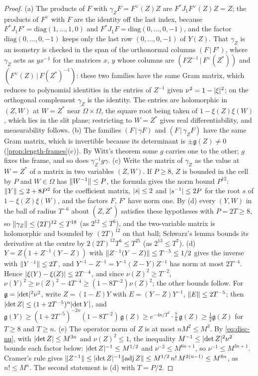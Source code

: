 \begin{proof}
(a) The products of $F$ with $\gamma_ZF=F^\vee(Z)Z$ are $F^*J_1F^\vee(Z)Z=Z$; the products of $F^\vee$ with $F$ are the identity off the last index, because $F^*J_1F'=\mathrm{diag}(1,\dots,1,0)$ and $F^*J_1F=\mathrm{diag}(0,\dots,0,-1)$, and the factor
$\mathrm{diag}(0,\dots,0,-1)$ keeps only the last row $(0,\dots,0,-1)$ of $Y(Z)$. That $\gamma_Z$ is an isometry is checked in the span of the orthonormal columns $(F\,|\,F')$, where $\gamma_Z$ acts as $yx^{-1}$ for the
matrices $x$, $y$ whose columns are $(FZ^{-1}\,|\,F^\vee(Z^*))$ and $(F^\vee(Z)\,|\,F(Z^*)^{-1})$: these two families have the same Gram matrix, which reduces to polynomial identities in the entries of $Z^{-1}$ given
$\nu^2=1-\lvert \xi\rvert^2$; on the orthogonal complement $\gamma_Z$ is the identity. The entries are holomorphic in $(Z,W)$ at $W=Z^*$ near $\Omega\times\Omega$, the square root being taken of $1-\xi(Z)\xi(W)$, which lies in the slit plane; restricting to
$W=Z^*$ gives real differentiability, and measurability follows. (b) The families $(F\,|\,\gamma F)$ and $(F\,|\,\gamma_ZF)$ have the same Gram matrix, which is invertible because its determinant is $\pm\mathfrak g(Z)\ne0$
(\cref{prop:length-frames}(c)). By Witt's theorem some $g$ carries one to the other; $g$ fixes the frame, and so does $\gamma_Z^{-1}g\gamma$. (c) Write the matrix of $\gamma_Z$ as the value at $W=Z^*$ of a matrix in two variables $(Z,W)$. If $P\ge8$, $Z$ is bounded in the cell by $P$ and $W\in\Omega$ has $\lVert W^{-1}\rVert\le P$, the formula gives the norm bound $P^{12}$:
$\lVert Y\rVert\le2+8P^2$ for the coefficient matrix, $\lvert s\rvert\le2$ and $\lvert s^{-1}\rvert\le2P$ for the root $s$ of $1-\xi(Z)\xi(W)$, and the factors $F$, $F'$ have norm one. By (d) every $(Y,W)$ in the ball of radius $T^{-6}$ about $(Z,Z^*)$
satisfies these hypotheses with $P=2T\ge8$, so $\lVert \gamma_Z\rVert\le(2T)^{12}\le T^{18}$ (as $2^{12}\le T^6$), and the two-variable matrix is holomorphic and bounded by $(2T)^{12}$ on that ball; Schwarz's lemma bounds its derivative at the centre by
$2(2T)^{12}T^6\le T^{25}$ (as $2^{13}\le T^7$). (d) $Y=Z(1+Z^{-1}(Y-Z))$ with $\lVert Z^{-1}(Y-Z)\rVert\le T^{-5}\le1/2$ gives the inverse with $\lVert Y^{-1}\rVert\le2T$, and
$Y^{-1}-Z^{-1}=Y^{-1}(Z-Y)Z^{-1}$ has norm at most $2T^{-4}$. Hence $\lvert \xi(Y)-\xi(Z)\rvert\le2T^{-4}$, and since $\nu(Z)^2\ge T^{-2}$, $\nu(Y)^2\ge\nu(Z)^2-4T^{-4}\ge(1-8T^{-2})\nu(Z)^2$; the other bounds follow. For $\mathfrak g=\lvert \det\rvert^2\nu^2$, write
$Z=(1-E)Y$ with $E=(Y-Z)Y^{-1}$, $\lVert E\rVert\le2T^{-5}$; then $\lvert \det Z\rvert\le(1+2T^{-5})^n\lvert \det Y\rvert$, and
$\mathfrak g(Y)\ge(1+2T^{-5})^{-2n}(1-8T^{-2})\,\mathfrak g(Z)\ge e^{-4n/T^5}\cdot\frac78\,\mathfrak g(Z)\ge\frac12\mathfrak g(Z)$ for $T\ge8$ and $T\ge n$. (e) The operator norm of $Z$ is at most $nM^2\le M^3$.
By \eqref{eq:disc-nu}, with $\lvert \det Z\rvert\le M^{3n}$ and $\nu(Z)^2\le1$, the inequality $M^{-1}\le\lvert \det Z\rvert^2\nu^2$ bounds each factor below: $\lvert \det Z\rvert^{-1}\le M^{1/2}$ and $\nu^{-2}\le M^{6n+1}$, so $\nu^{-1}\le M^{3n+1}$.
Cramer's rule gives $\lVert Z^{-1}\rVert\le\lvert \det Z\rvert^{-1}\lVert \mathrm{adj}\,Z\rVert\le M^{1/2}\,n!\,M^{2(n-1)}\le M^{8n}$, as $n!\le M^n$. The second statement is (d) with $T=P/2$.
\end{proof}

